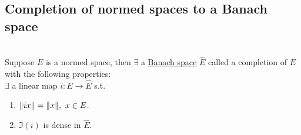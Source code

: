 \subsection{Completion of normed spaces to a Banach space}
\begin{theorem}\ \\
Suppose $E$ is a normed space, then $\exists$ a \underline{Banach space} $\hat{E}$ called a completion of $E$ with the following properties:\\
$\exists$ a linear map $i: E \to \hat{E}$ s.t. 
\begin{enumerate}[label = (\alph*)]
    \item $\norm{ix} = \norm{x},\ x \in E$.
    \item $\Im(i)$ is dense in $\hat{E}$.
\end{enumerate}
\end{theorem}
